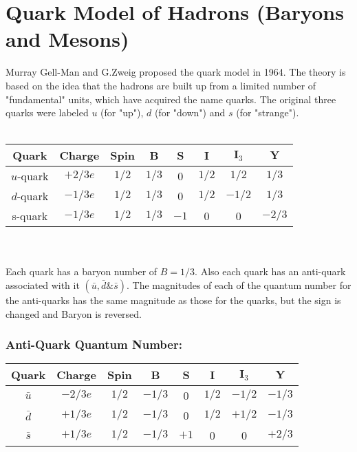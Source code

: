 \section{Quark Model of Hadrons (Baryons and Mesons)}
Murray Gell-Man and G.Zweig proposed the quark model in 1964. The theory is based on the idea that the hadrons are built up from a limited number of "fundamental" units, which have acquired the name quarks. The original three quarks were labeled $u$ (for "up"), $d$ (for "down") and $s$ (for "strange").\\\\
\renewcommand*{\arraystretch}{1.5}
\begin{tabular}{|c|c|c|c|c|c|c|c|}
	\hline Quark & Charge & Spin & B & S & I & $\mathbf{I}_3$ & $\mathbf{Y}$ \\
	\hline$u$-quark & $+2 / 3 e$ & $1 / 2$ & $1 / 3$ & 0 & $1 / 2$ & $1 / 2$ & $1 / 3$ \\
	\hline$d$-quark & $-1 / 3 e$ & $1 / 2$ & $1 / 3$ & 0 & $1 / 2$ & $-1 / 2$ & $1 / 3$ \\
	\hline s-quark & $-1 / 3 e$ & $1 / 2$ & $1 / 3$ & $-1$ & 0 & 0 & $-2 / 3$ \\
	\hline
\end{tabular}\\\\
Each quark has a baryon number of $B=1 / 3$. Also each quark has an anti-quark associated with it $(\bar{u}, \bar{d} \& \bar{s})$. The magnitudes of each of the quantum number for the anti-quarks has the same magnitude as those for the quarks, but the sign is changed and Baryon is reversed.
\subsubsection{Anti-Quark Quantum Number:}
\vspace{0.3cm}
\renewcommand*{\arraystretch}{1.5}
\begin{tabular}{|c|c|c|c|c|c|c|c|}
	\hline Quark & Charge & Spin & B & S & I & $\mathbf{I}_3$ & $\mathbf{Y}$ \\
	\hline $\bar{u}$ & $-2 / 3 e$ & $1 / 2$ & $-1 / 3$ & 0 & $1 / 2$ & $-1 / 2$ & $-1 / 3$ \\
	\hline $\bar{d}$ & $+1 / 3 e$ & $1 / 2$ & $-1 / 3$ & 0 & $1 / 2$ & $+1 / 2$ & $-1 / 3$ \\
	\hline $\bar{s}$ & $+1 / 3 e$ & $1 / 2$ & $-1 / 3$ & $+1$ & 0 & 0 & $+2 / 3$ \\
	\hline
\end{tabular}\\
